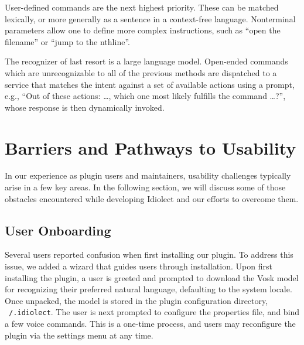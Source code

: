 \documentclass[conference]{IEEEtran}
\begin{document}
User-defined commands are the next highest priority. These can be matched lexically, or more generally as a sentence in a context-free language. Nonterminal parameters allow one to define more complex instructions, such as ``open the \textlangle filename'' or ``jump to the \textlangle nth\textrangle line''.


The recognizer of last resort is a large language model. Open-ended commands which are unrecognizable to all of the previous methods are dispatched to a service that matches the intent against a set of available actions using a prompt, e.g., ``Out of these actions: \ldots, which one most likely fulfills the command \ldots?'', whose response is then dynamically invoked.


\pagebreak\section{Barriers and Pathways to Usability}\label{sec:usability}

In our experience as plugin users and maintainers, usability challenges typically arise in a few key areas. In the following section, we will discuss some of those obstacles encountered while developing Idiolect and our efforts to overcome them.

\subsection{User Onboarding}

Several users reported confusion when first installing our plugin. To address this issue, we added a wizard that guides users through installation. Upon first installing the plugin, a user is greeted and prompted to download the Vosk model for recognizing their preferred natural language, defaulting to the system locale. Once unpacked, the model is stored in the plugin configuration directory, \texttt{~/.idiolect}. The user is next prompted to configure the properties file, and bind a few voice commands. This is a one-time process, and users may reconfigure the plugin via the settings menu at any time.
\end{document}
